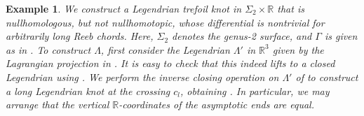 \documentclass[11pt]{amsart}
\theoremstyle{mystyle}
\newtheorem{example}[example]{Example}
\newcommand{\R}{\mathbb{R}}
\newcommand{\<}{\langle}
\renewcommand{\>}{\rangle}
\begin{document}
\begin{example}\label{exm:arbitrary long correct}
    We construct a Legendrian trefoil knot in $\Sigma_2\times \R$ that is nullhomologous, but not nullhomotopic, whose differential is nontrivial for arbitrarily long Reeb chords. Here, $\Sigma_2$ denotes the genus-2 surface, and $\Gamma$ is given as in . To construct $\Lambda$, first consider the Legendrian $\Lambda'$ in $\R^3$ given by the Lagrangian projection in . It is easy to check that this indeed lifts to a \textit{closed} Legendrian using \cite[Sec. 11]{chekanov2002dga}. We perform the inverse closing operation on $\Lambda'$ of \cite[Sec. 12]{chekanov2002dga} to construct a long Legendrian knot at the crossing $c_l$, obtaining . In particular, we may arrange that the vertical $\R$-coordinates of the asymptotic ends are equal. 
    \begin{figure}[h]
        \begin{minipage}{0.48\textwidth}
            \centering
\begin{tikzpicture}[x=0.55pt,y=0.55pt,yscale=-1,xscale=1]


\end{tikzpicture}
\end{minipage}
\end{figure}
\end{example}
\end{document}
